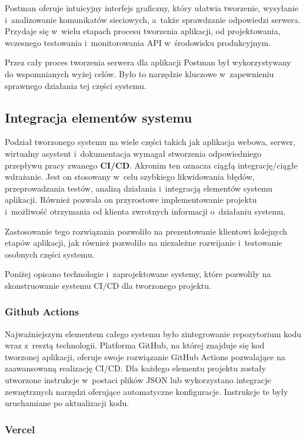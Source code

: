 Postman oferuje intuicyjny interfejs graficzny, który ułatwia tworzenie,
wysyłanie i~analizowanie komunikatów sieciowych, a~także sprawdzanie
odpowiedzi serwera. Przydaje się w~wielu etapach procesu tworzenia
aplikacji, od projektowania, wczesnego testowania i~monitorowania API
w~środowisku produkcyjnym.

Przez cały proces tworzenia serwera dla aplikacji Postman był wykorzystywany
do wspomnianych wyżej celów. Było to narzędzie kluczowe w~zapewnieniu
sprawnego działania tej części systemu.


\subsection{Integracja elementów systemu}

Podział tworzonego systemu na wiele części
takich jak aplikacja webowa, serwer, wirtualny asystent
i~dokumentacja wymagał stworzenia odpowiedniego
przepływu pracy zwanego \textbf{CI/CD}. Akronim ten oznacza
ciągłą integrację/ciągłe wdrażanie. Jest on stosowany
w~celu szybkiego likwidowania błędów, przeprowadzania
testów, analizą działania i~integracją elementów systemu
aplikacji. Również pozwala on przyrostowe implementowanie
projektu i~możliwość otrzymania od klienta zwrotnych
informacji o~działaniu systemu.

Zastosowanie tego rozwiązania pozwoliło na
prezentowanie klientowi kolejnych etapów aplikacji, jak
również pozwoliło na niezależne rozwijanie
i~testowanie osobnych części systemu.

Poniżej opisano technologie i~zaprojektowane systemy,
które pozwoliły na skonstruowanie systemu CI/CD dla
tworzonego projektu.


\subsubsection{Github Actions}

Najważniejszym elementem całego systemu było zintegrowanie
repozytorium kodu
wraz z~resztą technologii. Platforma GitHub, na której
znajduje się kod tworzonej aplikacji, oferuje swoje
rozwiązanie GitHub Actions\cite{GithubActions} pozwalające
na zaawansowaną realizację CI/CD. Dla każdego elementu
projektu zostały utworzone instrukcje w~postaci plików JSON
lub wykorzystano integracje zewnętrznych narzędzi oferujące
automatyczne konfiguracje. Instrukcje te były uruchamiane
po aktualizacji kodu.


\subsubsection{Vercel}

